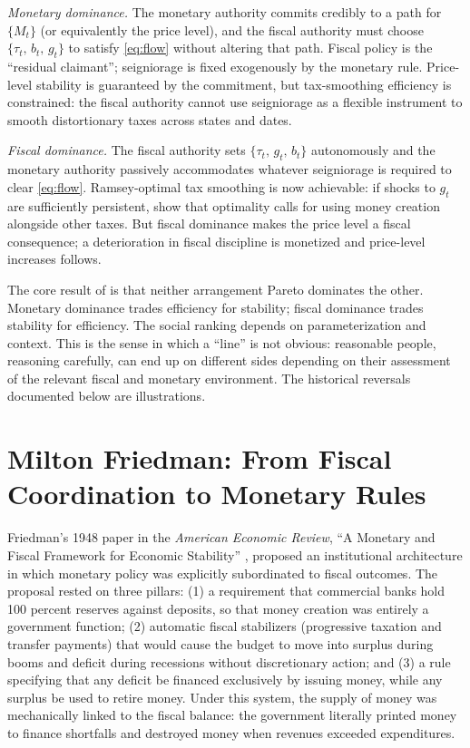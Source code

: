 \documentclass[12pt]{article}
\begin{document}
\textit{Monetary dominance.}  The monetary authority commits credibly to
a path for $\{M_t\}$ (or equivalently the price level), and the fiscal
authority must choose $\{\tau_t,\, b_t,\, g_t\}$ to satisfy
\eqref{eq:flow} without altering that path.  Fiscal policy is the
``residual claimant''; seigniorage is fixed exogenously by the monetary
rule.  Price-level stability is guaranteed by the commitment, but
tax-smoothing efficiency is constrained: the fiscal authority cannot use
seigniorage as a flexible instrument to smooth distortionary taxes across
states and dates.

\textit{Fiscal dominance.}  The fiscal authority sets
$\{\tau_t,\, g_t,\, b_t\}$ autonomously and the monetary authority
passively accommodates whatever seigniorage is required to clear
\eqref{eq:flow}.  Ramsey-optimal tax smoothing is now achievable:
if shocks to $g_t$ are sufficiently persistent, \citet{LucasStokey1983}
show that optimality calls for using money creation alongside other taxes.
But fiscal dominance makes the price level a fiscal consequence; a
deterioration in fiscal discipline is monetized and price-level
increases  follows.

The core result of \citet{Sargent2011} is that neither arrangement Pareto
dominates the other.  Monetary dominance trades efficiency for stability;
fiscal dominance trades stability for efficiency.  The social ranking
depends on parameterization and context.  This is the sense in which a
``line'' is not obvious: reasonable people, reasoning carefully, can end
up on different sides depending on their assessment of the relevant
fiscal and monetary environment.  The historical reversals documented
below are illustrations.


\section{Milton Friedman: From Fiscal Coordination to Monetary Rules}

Friedman's 1948 paper in the \textit{American Economic Review},
``A Monetary and Fiscal Framework for Economic Stability''
\citep{Friedman1948}, proposed an institutional architecture in which
monetary policy was explicitly subordinated to fiscal outcomes.  The
proposal rested on three pillars: (1) a requirement that commercial banks
hold 100 percent reserves against deposits, so that money creation was
entirely a government function; (2) automatic fiscal stabilizers
(progressive taxation and transfer payments) that would cause the budget
to move into surplus during booms and deficit during recessions without
discretionary action; and (3) a rule specifying that any deficit be
financed exclusively by issuing money, while any surplus be used to
retire money.  Under this system, the supply of money was mechanically
linked to the fiscal balance: the government literally printed money
to finance shortfalls and destroyed money when revenues exceeded
expenditures.
\end{document}
